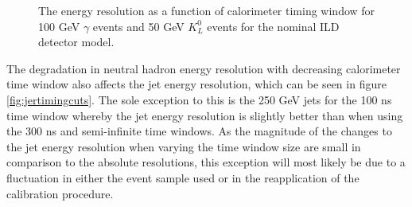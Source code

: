 \begin{figure}
\caption[The energy resolution as a function of calorimeter timing window for \protect{} 100 GeV $\gamma$ events and \protect{} 50 GeV $K^{0}_{L}$ events for the nominal ILD detector model.]{The energy resolution as a function of calorimeter timing window for \protect{} 100 GeV $\gamma$ events and \protect{} 50 GeV $K^{0}_{L}$ events for the nominal ILD detector model.}
\label{fig:ertimingcuts}
\end{figure}

The degradation in neutral hadron energy resolution with decreasing calorimeter time window also affects the jet energy resolution, which can be seen in figure \ref{fig:jertimingcuts}.  The sole exception to this is the 250 GeV jets for the 100 ns time window whereby the jet energy resolution is slightly better than when using the 300 ns and semi-infinite time windows.  As the magnitude of the changes to the jet energy resolution when varying the time window size are small in comparison to the absolute resolutions, this exception will most likely be due to a fluctuation in either the event sample used or in the reapplication of the calibration procedure.  

